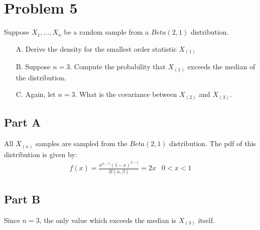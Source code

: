 \documentclass{article}
\begin{document}
\clearpage
\section*{Problem 5}
Suppose $X_1,...,X_n$ be a random sample from a $Beta(2,1)$ distribution.
\begin{enumerate}
\item[A.] Derive the density for the smallest order statistic $X_{(1)}$
\item[B.] Suppose $n = 3$. Compute the probability that $X_{(1)}$ exceeds the median of the distribution.
\item[C.] Again, let $n = 3$. What is the covariance between $X_{(2)}$ and $X_{(3)}$.

\end{enumerate}

\subsection*{Part A}
All $X_{(n)}$ samples are sampled from the $Beta(2,1)$ distribution. The pdf of this distribution is given by:
\begin{align*}
f(x) = \frac{x^{\alpha-1}(1-x)^{\beta-1}}{B(\alpha,\beta)} = 2x & 0<x<1
\end{align*}




\subsection*{Part B}
Since $n=3$, the only value which exceeds the median is $X_{(3)}$ itself.
\end{document}
